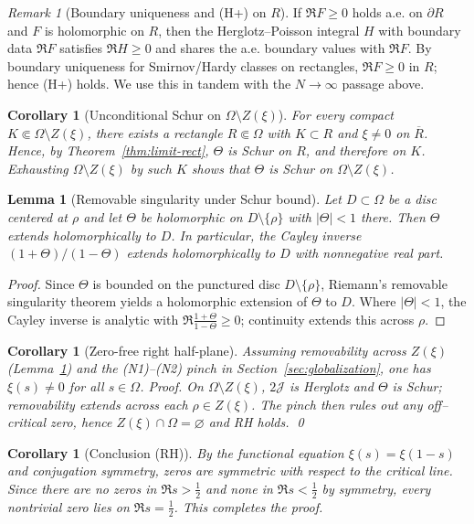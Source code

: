 \documentclass[11pt]{article}
\newtheorem{lemma}[theorem]{Lemma}
\newtheorem{corollary}[theorem]{Corollary}
\theoremstyle{definition}
\theoremstyle{remark}
\newtheorem{remark}[theorem]{Remark}
\begin{document}
\begin{remark}[Boundary uniqueness and (H+) on $R$]\label{rem:boundary-uniqueness}
If $\Re F\ge 0$ holds a.e. on $\partial R$ and $F$ is holomorphic on $R$, then the Herglotz–Poisson integral $H$ with boundary data $\Re F$ satisfies $\Re H\ge 0$ and shares the a.e. boundary values with $\Re F$. By boundary uniqueness for Smirnov/Hardy classes on rectangles, $\Re F\ge 0$ in $R$; hence (H+) holds. We use this in tandem with the $N\to\infty$ passage above.
\end{remark}
\begin{corollary}[Unconditional Schur on \(\Omega\setminus Z(\xi)\)]\label{cor:Schur-off-zeros}
For every compact \(K\Subset \Omega\setminus Z(\xi)\), there exists a rectangle \(R\Subset\Omega\) with \(K\subset R\) and \(\xi\neq 0\) on \(\overline R\). Hence, by Theorem~\ref{thm:limit-rect}, \(\Theta\) is Schur on $R$, and therefore on $K$. Exhausting \(\Omega\setminus Z(\xi)\) by such \(K\) shows that \(\Theta\) is Schur on \(\Omega\setminus Z(\xi)\).
\end{corollary}
\begin{lemma}[Removable singularity under Schur bound]\label{lem:removable-schur}
Let $D\subset\Omega$ be a disc centered at $\rho$ and let $\Theta$ be holomorphic on $D\setminus\{\rho\}$ with $|\Theta|<1$ there. Then $\Theta$ extends holomorphically to $D$. In particular, the Cayley inverse $(1+\Theta)/(1-\Theta)$ extends holomorphically to $D$ with nonnegative real part.
\end{lemma}
\begin{proof}
Since $\Theta$ is bounded on the punctured disc $D\setminus\{\rho\}$, Riemann's removable singularity theorem yields a holomorphic extension of $\Theta$ to $D$. Where $|\Theta|<1$, the Cayley inverse is analytic with $\Re\tfrac{1+\Theta}{1-\Theta}\ge 0$; continuity extends this across $\rho$.
\end{proof}



\begin{corollary}[Zero-free right half-plane]
Assuming removability across $Z(\xi)$ (Lemma~\ref{lem:removable-schur}) and the (N1)–(N2) pinch in Section~\ref{sec:globalization}, one has $\xi(s)\neq 0$ for all $s\in\Omega$.
\emph{Proof.}
On $\Omega\setminus Z(\xi)$, $2\mathcal J$ is Herglotz and $\Theta$ is Schur; removability extends across each $\rho\in Z(\xi)$. The pinch then rules out any off–critical zero, hence $Z(\xi)\cap\Omega=\varnothing$ and RH holds. \qed
\end{corollary}
\begin{corollary}[Conclusion (RH)]
By the functional equation $\xi(s)=\xi(1-s)$ and conjugation symmetry, zeros are symmetric with respect to the critical line. Since there are no zeros in $\Re s>\tfrac12$ and none in $\Re s<\tfrac12$ by symmetry, every nontrivial zero lies on $\Re s=\tfrac12$. This completes the proof.
\end{corollary}
\end{document}
